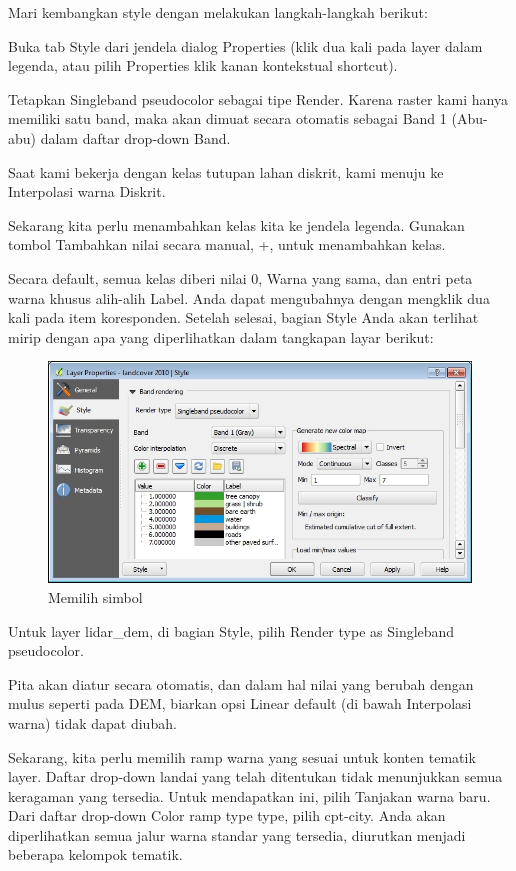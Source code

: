 \documentclass[]{book}
\begin{document}
Mari kembangkan style dengan melakukan langkah-langkah berikut:

Buka tab Style dari jendela dialog Properties (klik dua kali pada layer dalam legenda, atau pilih Properties klik kanan kontekstual shortcut).

Tetapkan Singleband pseudocolor sebagai tipe Render. Karena raster kami hanya memiliki satu band, maka akan dimuat secara otomatis sebagai Band 1 (Abu-abu) dalam daftar drop-down Band.

Saat kami bekerja dengan kelas tutupan lahan diskrit, kami menuju ke Interpolasi warna \textbar{} Diskrit.

Sekarang kita perlu menambahkan kelas kita ke jendela legenda. Gunakan tombol Tambahkan nilai secara manual, +, untuk menambahkan kelas.

Secara default, semua kelas diberi nilai 0, Warna yang sama, dan entri peta warna khusus alih-alih Label. Anda dapat mengubahnya dengan mengklik dua kali pada item koresponden. Setelah selesai, bagian Style Anda akan terlihat mirip dengan apa yang diperlihatkan dalam tangkapan layar berikut:

\begin{figure}

{\centering \includegraphics[width=0.3\linewidth]{images/09/fig911} 

}

\caption{Memilih simbol}\label{fig:fig911a}
\end{figure}

Untuk layer lidar\_dem, di bagian Style, pilih Render type as Singleband pseudocolor.

Pita akan diatur secara otomatis, dan dalam hal nilai yang berubah dengan mulus seperti pada DEM, biarkan opsi Linear default (di bawah Interpolasi warna) tidak dapat diubah.

Sekarang, kita perlu memilih ramp warna yang sesuai untuk konten tematik layer. Daftar drop-down landai yang telah ditentukan tidak menunjukkan semua keragaman yang tersedia. Untuk mendapatkan ini, pilih Tanjakan warna baru. Dari daftar drop-down Color ramp type type, pilih cpt-city. Anda akan diperlihatkan semua jalur warna standar yang tersedia, diurutkan menjadi beberapa kelompok tematik.
\end{document}

